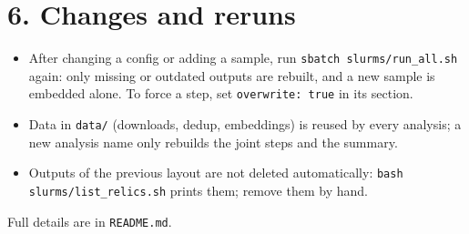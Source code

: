 \documentclass[
  10pt,
]{article}
\providecommand{\tightlist}{%
  \setlength{\itemsep}{0pt}\setlength{\parskip}{0pt}}
\begin{document}
\section{6. Changes and reruns}

\begin{itemize}
\tightlist
\item After changing a config or adding a sample, run \texttt{sbatch slurms/run\_all.sh} again: only missing or outdated outputs are rebuilt, and a new sample is embedded alone. To force a step, set \texttt{overwrite: true} in its section.
\item Data in \texttt{data/} (downloads, dedup, embeddings) is reused by every analysis; a new analysis name only rebuilds the joint steps and the summary.
\item Outputs of the previous layout are not deleted automatically: \texttt{bash slurms/list\_relics.sh} prints them; remove them by hand.
\end{itemize}

Full details are in \texttt{README.md}.
\end{document}
